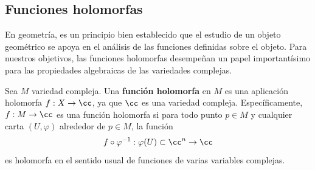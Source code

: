     \subsection{Funciones holomorfas}
	En geometría, es un principio bien establecido que el estudio de un objeto geométrico se apoya en el análisis de las funciones definidas sobre el objeto. Para nuestros objetivos, las funciones holomorfas desempeñan un papel importantísimo para las propiedades algebraicas de las variedades complejas.
	
     \begin{definition}
        Sea $M$ variedad compleja. Una \textbf{función holomorfa} en $M$ es una aplicación holomorfa $f:X\to\cc$, ya que $\cc$ es una variedad compleja. Específicamente, $f:M\to \cc$ es una función holomorfa si para todo punto $p\in M$ y cualquier carta $(U,\varphi)$ alrededor de $p\in M$, la función
        \begin{equation*}
            f\circ \varphi^{-1}:\varphi(U)\subset\cc^n\to\cc
        \end{equation*}
		es holomorfa en el sentido usual de funciones de varias variables complejas.
    \end{definition}
		
